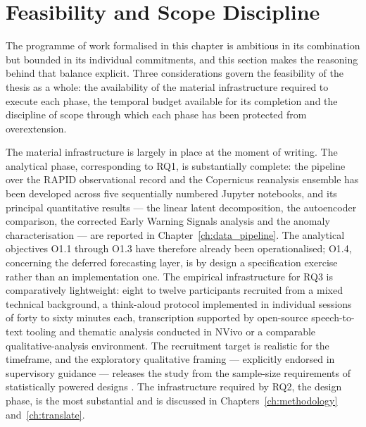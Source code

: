 \section{Feasibility and Scope Discipline}
\label{sec:rq-feasibility}

The programme of work formalised in this chapter is ambitious in its combination but bounded in its individual commitments, and this section makes the reasoning behind that balance explicit. Three considerations govern the feasibility of the thesis as a whole: the availability of the material infrastructure required to execute each phase, the temporal budget available for its completion and the discipline of scope through which each phase has been protected from overextension.

The material infrastructure is largely in place at the moment of writing. The analytical phase, corresponding to RQ1, is substantially complete: the pipeline over the RAPID observational record and the Copernicus reanalysis ensemble has been developed across five sequentially numbered Jupyter notebooks, and its principal quantitative results --- the linear latent decomposition, the autoencoder comparison, the corrected Early Warning Signals analysis and the anomaly characterisation --- are reported in Chapter~\ref{ch:data_pipeline}. The analytical objectives O1.1 through O1.3 have therefore already been operationalised; O1.4, concerning the deferred forecasting layer, is by design a specification exercise rather than an implementation one. The empirical infrastructure for RQ3 is comparatively lightweight: eight to twelve participants recruited from a mixed technical background, a think-aloud protocol implemented in individual sessions of forty to sixty minutes each, transcription supported by open-source speech-to-text tooling and thematic analysis conducted in NVivo or a comparable qualitative-analysis environment. The recruitment target is realistic for the timeframe, and the exploratory qualitative framing --- explicitly endorsed in supervisory guidance --- releases the study from the sample-size requirements of statistically powered designs \citep{braunclarke2006, smithmcgannon2018}. The infrastructure required by RQ2, the design phase, is the most substantial and is discussed in Chapters~\ref{ch:methodology} and~\ref{ch:translate}.

